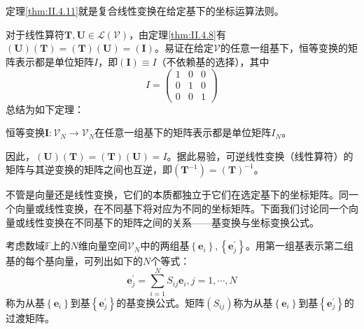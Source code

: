 \documentclass[main.tex]{subfiles}
\begin{document}
定理\ref{thm:II.4.11}就是复合线性变换在给定基下的坐标运算法则。

对于线性算符$\mathbf{T},\mathbf{U}\in\mathcal{L}\left(\mathcal{V}\right)$，由定理\ref{thm:II.4.8}有$\left(\mathbf{U}\right)\left(\mathbf{T}\right)=\left(\mathbf{T}\right)\left(\mathbf{U}\right)=\left(\mathbf{I}\right)$。易证在给定$\mathcal{V}$的任意一组基下，恒等变换的矩阵表示都是单位矩阵$I$，即$\left(\mathbf{I}\right)\equiv I$（不依赖基的选择），其中
\[I=\begin{pmatrix}1&0&0\\0&1&0\\0&0&1\end{pmatrix}\]
总结为如下定理：
\begin{theorem}
恒等变换$\mathbf{I}:\mathcal{V}_N\rightarrow\mathcal{V}_N$在任意一组基下的矩阵表示都是单位矩阵$I_N$。
\end{theorem}
因此，$\left(\mathbf{U}\right)\left(\mathbf{T}\right)=\left(\mathbf{T}\right)\left(\mathbf{U}\right)=I$。据此易验，可逆线性变换（线性算符）的矩阵与其逆变换的矩阵之间也互逆，即$\left(\mathbf{T}^{-1}\right)=\left(\mathbf{T}\right)^{-1}$。

不管是向量还是线性变换，它们的本质都独立于它们在选定基下的坐标矩阵。同一个向量或线性变换，在不同基下将对应为不同的坐标矩阵。下面我们讨论同一个向量或线性变换在不同基下的矩阵之间的关系——基变换与坐标变换公式。

考虑数域$\mathbb{F}$上的$N$维向量空间$\mathcal{V}_N$中的两组基$\left\{\mathbf{e}_i\right\},\left\{\mathbf{e}^\prime_j\right\}$。用第一组基表示第二组基的每个基向量，可列出如下的$N$个等式：
\[\mathbf{e}^\prime_j=\sum_{i=1}^NS_{ij}\mathbf{e}_i,j=1,\cdots,N\]
称为从基$\left\{\mathbf{e}_i\right\}$到基$\left\{\mathbf{e}^\prime_j\right\}$的基变换公式。矩阵$\left(S_{ij}\right)$称为从基$\left\{\mathbf{e}_i\right\}$到基$\left\{\mathbf{e}^\prime_j\right\}$的过渡矩阵。
\end{document}
